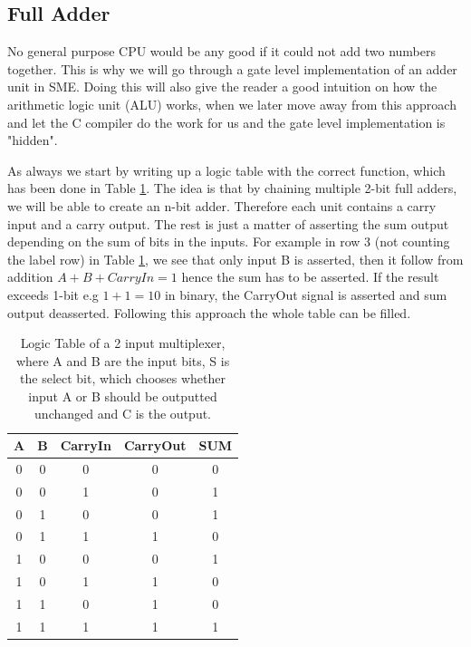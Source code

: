     \subsection{Full Adder}
        No general purpose CPU would be any good if it could not add two numbers together. This is why we will go through a gate level implementation of an adder unit in SME. Doing this will also give the reader a good intuition on how the arithmetic logic unit (ALU) works, when we later move away from this approach and let the C compiler do the work for us and the gate level implementation is "hidden".
        
        As always we start by writing up a logic table with the correct function, which has been done in Table \ref{LogicTable:1BitFullAdder}. The idea is that by chaining multiple 2-bit full adders, we will be able to create an n-bit adder. Therefore each unit contains a carry input and a carry output. The rest is just a matter of asserting the sum output depending on the sum of bits in the inputs. For example in row 3 (not counting the label row) in Table \ref{LogicTable:1BitFullAdder}, we see that only input B is asserted, then it follow from addition $A+B+CarryIn=1$ hence the sum has to be asserted. If the result exceeds 1-bit e.g $1+1=10$ in binary, the CarryOut signal is asserted and sum output deasserted. Following this approach the whole table can be filled.
        
        \begin{table}[h!]
            \centering
            \begin{tabular}{|c|c|c||c|c|}
                \hline
                \textbf{A} & \textbf{B} & \textbf{CarryIn} & \textbf{CarryOut} & \textbf{SUM} \\ \hline
                0      &     0      &        0         &         0         &      0       \\ \hline
                0      &     0      &        1         &         0         &      1       \\ \hline
                0      &     1      &        0         &         0         &      1       \\ \hline
                0      &     1      &        1         &         1         &      0       \\ \hline
                1      &     0      &        0         &         0         &      1       \\ \hline
                1      &     0      &        1         &         1         &      0       \\ \hline
                1      &     1      &        0         &         1         &      0       \\ \hline
                1      &     1      &        1         &         1         &      1       \\ \hline
            \end{tabular}
            \caption{Logic Table of a 2 input multiplexer, where A and B are the input bits, S is the select bit, which chooses whether input A or B should be outputted unchanged and C is the output. }
            \label{LogicTable:1BitFullAdder}
        \end{table}
        
